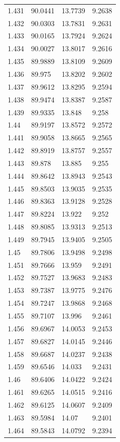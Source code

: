 \begin{tabular}{llll}
1.431 & 90.0441 & 13.7739 & 9.2638 \\
1.432 & 90.0303 & 13.7831 & 9.2631 \\
1.433 & 90.0165 & 13.7924 & 9.2624 \\
1.434 & 90.0027 & 13.8017 & 9.2616 \\
1.435 & 89.9889 & 13.8109 & 9.2609 \\
1.436 & 89.975 & 13.8202 & 9.2602 \\
1.437 & 89.9612 & 13.8295 & 9.2594 \\
1.438 & 89.9474 & 13.8387 & 9.2587 \\
1.439 & 89.9335 & 13.848 & 9.258 \\
1.44 & 89.9197 & 13.8572 & 9.2572 \\
1.441 & 89.9058 & 13.8665 & 9.2565 \\
1.442 & 89.8919 & 13.8757 & 9.2557 \\
1.443 & 89.878 & 13.885 & 9.255 \\
1.444 & 89.8642 & 13.8943 & 9.2543 \\
1.445 & 89.8503 & 13.9035 & 9.2535 \\
1.446 & 89.8363 & 13.9128 & 9.2528 \\
1.447 & 89.8224 & 13.922 & 9.252 \\
1.448 & 89.8085 & 13.9313 & 9.2513 \\
1.449 & 89.7945 & 13.9405 & 9.2505 \\
1.45 & 89.7806 & 13.9498 & 9.2498 \\
1.451 & 89.7666 & 13.959 & 9.2491 \\
1.452 & 89.7527 & 13.9683 & 9.2483 \\
1.453 & 89.7387 & 13.9775 & 9.2476 \\
1.454 & 89.7247 & 13.9868 & 9.2468 \\
1.455 & 89.7107 & 13.996 & 9.2461 \\
1.456 & 89.6967 & 14.0053 & 9.2453 \\
1.457 & 89.6827 & 14.0145 & 9.2446 \\
1.458 & 89.6687 & 14.0237 & 9.2438 \\
1.459 & 89.6546 & 14.033 & 9.2431 \\
1.46 & 89.6406 & 14.0422 & 9.2424 \\
1.461 & 89.6265 & 14.0515 & 9.2416 \\
1.462 & 89.6125 & 14.0607 & 9.2409 \\
1.463 & 89.5984 & 14.07 & 9.2401 \\
1.464 & 89.5843 & 14.0792 & 9.2394 \\

\end{tabular}
